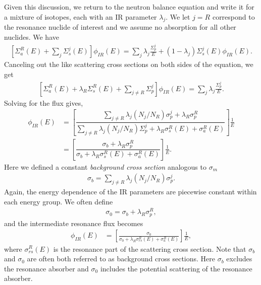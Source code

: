 Given this discussion, we return to the neutron balance equation and write it for a mixture of isotopes, each with an IR parameter $\lambda_j$. We let $j = R$ correspond to the resonance nuclide of interest and we assume no absorption for all other nuclides. We have
\begin{align}
  \left[ \Sigma_a^R(E) +  \sum_j \Sigma_s^j(E) \right] \phi_{IR}(E) = \sum_j \lambda_j \frac{ \Sigma_p^j }{ E } + ( 1 - \lambda_j ) \Sigma_s^j(E) \phi_{IR}(E) .
\end{align}
Canceling out the like scattering cross sections on both sides of the equation, we get
\begin{align}
  \left[ \Sigma_a^R(E) + \lambda_R \Sigma_s^R(E) +  \sum_{j \ne R} \Sigma_p^j \right] \phi_{IR}(E) = \sum_j \lambda_j \frac{ \Sigma_p^j }{ E } .
\end{align}
Solving for the flux gives,
\begin{align}
  \phi_{IR}(E) 
  &= \left[ \dfrac{ \displaystyle\sum_{j \ne R} \lambda_j ( N_j / N_R )  \sigma_p^j + \lambda_R \sigma_p^R }{ \displaystyle\sum_{j \ne R} \lambda_j ( N_j / N_R )  \Sigma_p^j + \lambda_R \sigma_s^R(E) + \sigma_a^R(E)  }  \right] \frac{1}{ E} \nonumber \\
  &=  \left[ \dfrac{ \sigma_b + \lambda_R \sigma_p^R }{ \sigma_b + \lambda_R \sigma_s^R(E) + \sigma_a^R(E)  }  \right] \frac{1}{ E} . \label{Eq:libraryGeneration_IRFluxSpectrum_EnergyVerbose}
\end{align}
Here we defined a constant \emph{background cross section} analogous to $\sigma_m$
\begin{align}
  \sigma_b = \displaystyle\sum_{j \ne R} \lambda_j ( N_j / N_R )  \sigma_p^j .
\end{align}
Again, the energy dependence of the IR parameters are piecewise constant within each energy group. We often define
\begin{align}
  \sigma_0 = \sigma_b + \lambda_R \sigma_p^R ,
\end{align} 
and the intermediate resonance flux becomes
\begin{align}
  \phi_{IR}(E) 
  &=  \left[ \frac{ \sigma_0 }{ \sigma_0 + \lambda_R \sigma_{rs}^R(E) + \sigma_a^R(E)  }  \right] \frac{1}{ E} ,
\end{align}
where $\sigma_{rs}^R(E)$ is the resonance part of the scattering cross section. Note that $\sigma_b$ and $\sigma_0$ are often both referred to as background cross sections. Here $\sigma_b$ excludes the resonance absorber and $\sigma_0$ includes the potential scattering of the resonance absorber.

